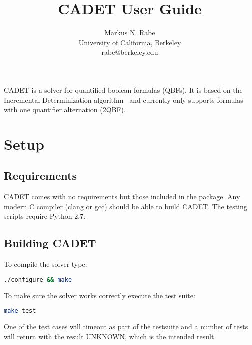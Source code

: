 \documentclass{article}
\title{CADET User Guide}
\author{Markus N. Rabe \\ University of California, Berkeley \\ rabe@berkeley.edu}
\begin{document}
\maketitle

CADET is a solver for quantified boolean formulas (QBFs). 
It is based on the Incremental Determinization algorithm~\cite{RabeSeshia/2016/IncrementalDeterminization} and currently only supports formulas with one quantifier alternation (2QBF).

\tableofcontents


\section{Setup}

\subsection{Requirements}

CADET comes with no requirements but those included in the package. 
%
Any modern C compiler (clang or gcc) should be able to build CADET. 
The testing scripts require Python 2.7.


\subsection{Building CADET}
To compile the solver type:

\begin{lstlisting}[language = bash,
				   basicstyle=\footnotesize\ttfamily,
                   xleftmargin = 1cm,
                   framexleftmargin = 1em]
./configure && make
\end{lstlisting}

\noindent
To make sure the solver works correctly execute the test suite:

\begin{lstlisting}[language = bash,
				   basicstyle=\footnotesize\ttfamily,
                   xleftmargin = 1cm,
                   framexleftmargin = 1em]
make test
\end{lstlisting}
One of the test cases will timeout as part of the testsuite and a number of tests will return with the result UNKNOWN, which is the intended result. 
\end{document}
